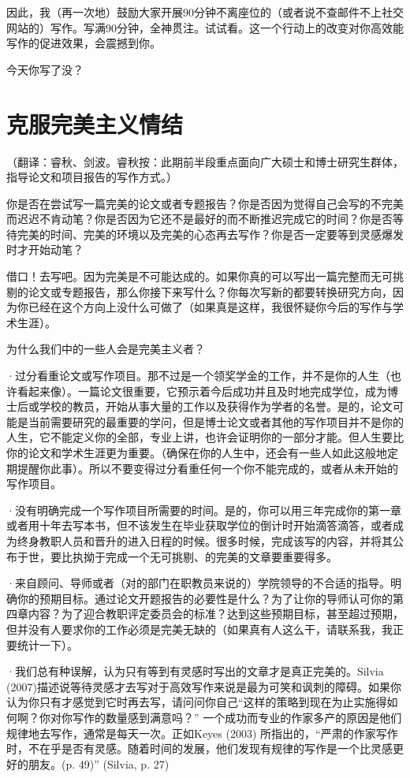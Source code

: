 \documentclass{ctexart}
\begin{document}
因此，我（再一次地）鼓励大家开展90分钟不离座位的（或者说不查邮件不上社交网站的）写作。写满90分钟，全神贯注。试试看。这一个行动上的改变对你高效能写作的促进效果，会震撼到你。

今天你写了没？

\section{克服完美主义情结}
（翻译：睿秋、剑波。睿秋按：此期前半段重点面向广大硕士和博士研究生群体，指导论文和项目报告的写作方式。）

你是否在尝试写一篇完美的论文或者专题报告？你是否因为觉得自己会写的不完美而迟迟不肯动笔？你是否因为它还不是最好的而不断推迟完成它的时间？你是否等待完美的时间、完美的环境以及完美的心态再去写作？你是否一定要等到灵感爆发时才开始动笔？

借口！去写吧。因为完美是不可能达成的。如果你真的可以写出一篇完整而无可挑剔的论文或专题报告，那么你接下来写什么？你每次写新的都要转换研究方向，因为你已经在这个方向上没什么可做了（如果真是这样，我很怀疑你今后的写作与学术生涯）。

为什么我们中的一些人会是完美主义者？

·过分看重论文或写作项目。那不过是一个领奖学金的工作，并不是你的人生（也许看起来像）。一篇论文很重要，它预示着今后成功并且及时地完成学位，成为博士后或学校的教员，开始从事大量的工作以及获得作为学者的名誉。是的，论文可能是当前需要研究的最重要的学问，但是博士论文或者其他的写作项目并不是你的人生，它不能定义你的全部，专业上讲，也许会证明你的一部分才能。但人生要比你的论文和学术生涯更为重要。（确保在你的人生中，还会有一些人如此这般地定期提醒你此事）。所以不要变得过分看重任何一个你不能完成的，或者从未开始的写作项目。

·没有明确完成一个写作项目所需要的时间。是的，你可以用三年完成你的第一章或者用十年去写本书，但不该发生在毕业获取学位的倒计时开始滴答滴答，或者成为终身教职人员和晋升的进入日程的时候。很多时候，完成该写的内容，并将其公布于世，要比执拗于完成一个无可挑剔、的完美的文章要重要得多。

·来自顾问、导师或者（对的部门在职教员来说的）学院领导的不合适的指导。明确你的预期目标。通过论文开题报告的必要性是什么？为了让你的导师认可你的第四章内容？为了迎合教职评定委员会的标准？达到这些预期目标，甚至超过预期，但并没有人要求你的工作必须是完美无缺的（如果真有人这么干，请联系我，我正要统计一下）。

·我们总有种误解，认为只有等到有灵感时写出的文章才是真正完美的。Silvia (2007)描述说等待灵感才去写对于高效写作来说是最为可笑和讽刺的障碍。如果你认为你只有才感觉到它时再去写，请问问你自己“这样的策略到现在为止实施得如何啊？你对你写作的数量感到满意吗？” 一个成功而专业的作家多产的原因是他们规律地去写作，通常是每天一次。正如Keyes (2003) 所指出的，“严肃的作家写作时，不在乎是否有灵感。随着时间的发展，他们发现有规律的写作是一个比灵感更好的朋友。(p. 49)” (Silvia, p. 27)
\end{document}
